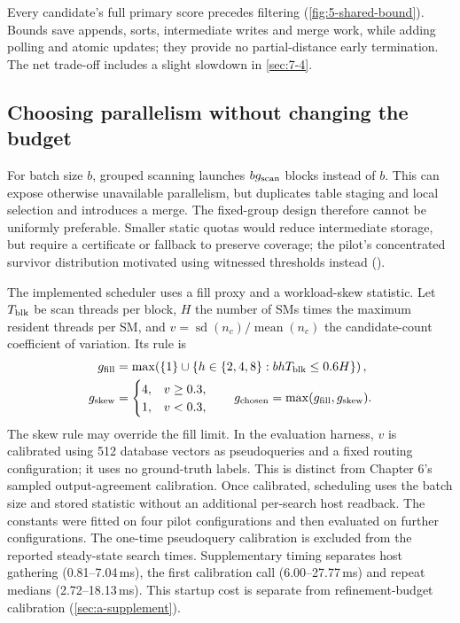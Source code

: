 Every candidate's full primary score precedes filtering
(\cref{fig:5-shared-bound}). Bounds save appends, sorts, intermediate
writes and merge work, while adding polling and atomic updates; they
provide no partial-distance early termination. The net trade-off includes
a slight slowdown in \cref{sec:7-4}.

\subsection{Choosing parallelism without changing the budget}

For batch size $b$, grouped scanning launches $bg_{\mathrm{scan}}$ blocks instead of $b$.
This can expose otherwise unavailable parallelism, but duplicates table
staging and local selection and introduces a merge. The fixed-group
design therefore cannot be uniformly preferable. Smaller static quotas
would reduce intermediate storage, but require a certificate or fallback
to preserve coverage; the pilot's concentrated survivor distribution
motivated using witnessed thresholds instead ().

The implemented scheduler uses a fill proxy and a workload-skew
statistic. Let $T_{\rm blk}$ be scan threads per block, $H$ the number of SMs times
the maximum resident threads per SM, and
$v=\operatorname{sd}(n_c)/\operatorname{mean}(n_c)$ the candidate-count
coefficient of variation. Its rule is
\begin{align}
 g_{\rm fill}
 &=\max\!\left(\{1\}\cup
       \{h\in\{2,4,8\}:bhT_{\rm blk}\leq0.6H\}\right),
       \label{eq:5-fill-rule}\\
 g_{\rm skew}&=
   \begin{cases}4,&v\geq0.3,\\1,&v<0.3,\end{cases}
 \qquad
 g_{\rm chosen}=\max(g_{\rm fill},g_{\rm skew}).
 \label{eq:5-skew-rule}
\end{align}
The skew rule may override the fill limit. In the evaluation harness,
$v$ is calibrated using 512 database vectors as pseudoqueries and a
fixed routing configuration; it uses no ground-truth labels. This is
distinct from Chapter 6's sampled output-agreement calibration. Once
calibrated, scheduling uses the batch size and stored statistic without
an additional per-search host readback. The constants were fitted on
four pilot configurations and then evaluated on further configurations.
The one-time pseudoquery calibration is excluded from
the reported steady-state search times. Supplementary timing separates
host gathering (0.81--7.04\,ms), the first calibration call
(6.00--27.77\,ms) and repeat medians (2.72--18.13\,ms). This startup
cost is separate from refinement-budget calibration (\cref{sec:a-supplement}).

